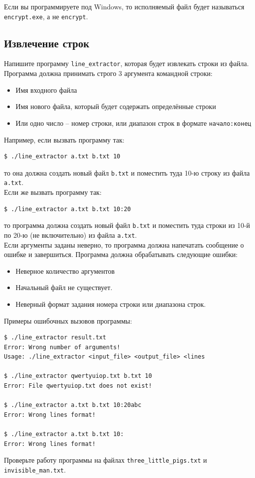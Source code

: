 \documentclass{article}
\begin{document}
\noindent Если вы программируете под Windows, то исполняемый файл будет называться \texttt{encrypt.exe}, а не \texttt{encrypt}.


\subsection{Извлечение строк}
Напишите программу \texttt{line\_extractor}, которая будет извлекать строки из файла. Программа должна принимать строго 3 аргумента командной строки:
\begin{itemize}
\item Имя входного файла
\item Имя нового файла, который будет содержать определённые строки
\item Или одно число -- номер строки, или диапазон строк в формате \texttt{начало:конец}
\end{itemize}

\noindent Например, если вызвать программу так:
\begin{lstlisting}
$ ./line_extractor a.txt b.txt 10
\end{lstlisting}
то она должна создать новый файл \texttt{b.txt} и поместить туда 10-ю строку из файла \texttt{a.txt}.\\

\noindent Если же вызвать программу так:
\begin{lstlisting}
$ ./line_extractor a.txt b.txt 10:20
\end{lstlisting}
то программа должна создать новый файл \texttt{b.txt} и поместить туда строки из 10-й по 20-ю (не включительно) из файла \texttt{a.txt}.\\

\noindent Если аргументы заданы неверно, то программа должна напечатать сообщение о ошибке и завершиться. Программа должна обрабатывать следующие ошибки:
\begin{itemize}
\item Неверное количество аргументов
\item Начальный файл не существует.
\item Неверный формат задания номера строки или диапазона строк.
\end{itemize}
Примеры ошибочных вызовов программы:
\begin{lstlisting}
$ ./line_extractor result.txt
Error: Wrong number of arguments!
Usage: ./line_extractor <input_file> <output_file> <lines

$ ./line_extractor qwertyuiop.txt b.txt 10
Error: File qwertyuiop.txt does not exist!

$ ./line_extractor a.txt b.txt 10:20abc
Error: Wrong lines format!

$ ./line_extractor a.txt b.txt 10:
Error: Wrong lines format!
\end{lstlisting}
Проверьте работу программы на файлах \texttt{three\_little\_pigs.txt} и \texttt{invisible\_man.txt}.
\end{document}
